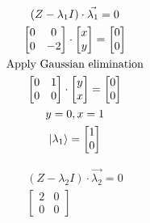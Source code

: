 \documentclass[]{article}
\begin{document}
\begin{enumerate}
\begin{enumerate}
          \noindent\begin{minipage}{.49\linewidth}
            \begin{gather*}
              (Z - \lambda_1 I) \cdot \vec{\lambda_1} = 0\\
              \begin{bmatrix}
                0 & 0\\
                0 & -2
              \end{bmatrix}
              \cdot 
              \begin{bmatrix}
                x\\ y
              \end{bmatrix}
              = \begin{bmatrix}
                0\\0
              \end{bmatrix}\\
              \text{Apply Gaussian elimination}\\
              \begin{bmatrix}
                0 & 1\\
                0 & 0
              \end{bmatrix}
              \cdot 
              \begin{bmatrix}
                y\\ x
              \end{bmatrix}
              = \begin{bmatrix}
                0\\0
              \end{bmatrix}\\
              y = 0, x = 1\\
              \ket{\lambda_1} = \begin{bmatrix}
                1\\0
              \end{bmatrix}
            \end{gather*}
          \end{minipage}
          \begin{minipage}{.49\linewidth}
            \begin{gather*}
              (Z - \lambda_2 I) \cdot \vec{\lambda_2} = 0\\
              \begin{bmatrix}
                2 & 0\\
                0 & 0
              \end{bmatrix}

\end{gather*}
\end{minipage}
\end{enumerate}
\end{enumerate}
\end{document}
